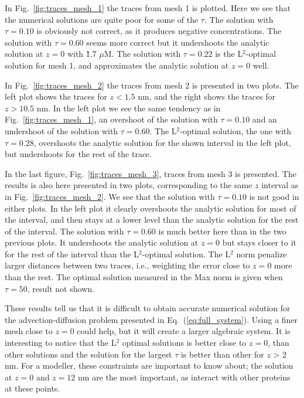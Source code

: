 In Fig.~\ref{fig:traces_mesh_1} the traces from mesh 1 is plotted. Here we see that the numerical solutions are quite poor for some of the $\tau$. The solution with $\tau=0.10$ is obviously not correct, as it produces negative concentrations. The solution with $\tau=0.60$ seems more correct but it undershoots the analytic solution at $z=0$ with \~ 1.7 $\mu$M. The solution with $\tau=0.22$ is the L$^2$-optimal solution for mesh 1, and approximates the analytic solution at $z=0$ well.\par

In Fig.~\ref{fig:traces_mesh_2} the traces from mesh 2 is presented in two plots. The left plot shows the traces for $z<1.5$ nm, and the right shows the traces for $z>10.5$ nm. In the left plot we see the same tendency as in Fig.~\ref{fig:traces_mesh_1}, an overshoot of the solution with $\tau=0.10$ and an undershoot of the solution with $\tau=0.60$. The L$^2$-optimal solution, the one with $\tau=0.28$, overshoots the analytic solution for the shown interval in the left plot, but undershoots for the rest of the trace. \par

In the last figure, Fig.~\ref{fig:traces_mesh_3}, traces from mesh 3 is presented. The results is also here presented in two plots, corresponding to the same $z$ interval as in Fig.~\ref{fig:traces_mesh_2}. We see that the solution with $\tau=0.10$ is not good in either plots. In the left plot it clearly overshoots the analytic solution for most of the interval, and then stays at a lower level than the analytic solution for the rest of the interval. The solution with $\tau=0.60$ is much better here than in the two previous plots. It undershoots the analytic solution at $z=0$ but stays closer to it for the rest of the interval than the L$^2$-optimal solution. The L$^2$ norm penalize larger distances between two traces, i.e., weighting the error close to $z=0$ more than the rest. The optimal solution measured in the Max norm is given when $\tau=50$, result not shown.\par

These results tell us that it is difficult to obtain accurate numerical solution for the advection-diffusion problem presented in Eq.~(\ref{eq:full_system}). Using a finer mesh close to $z=0$ could help, but it will create a larger algebraic system. It is interesting to notice that the L$^2$ optimal solutions is better close to $z=0$, than other solutions and the solution for the largest $\tau$ is better than other for $z$ > 2 nm. For a modeller, these constraints are important to know about; the solution at $z=0$ and $z=12$ nm are the most important, as \Ca interact with other proteins at these points.\par

